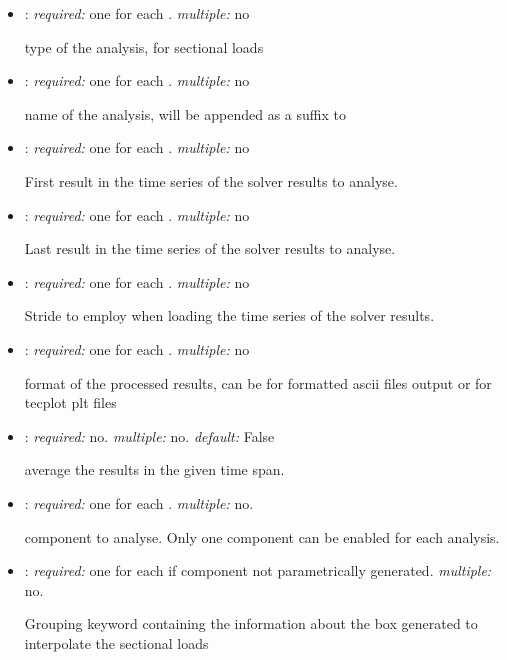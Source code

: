 \begin{itemize}
\item {}: \textit{required:} one for each . \textit{multiple:} no

type of the analysis,  for sectional loads

\item {}: \textit{required:} one for each . \textit{multiple:} no

name of the analysis, will be appended as a suffix to 

\item {}: \textit{required:} one for each . 
\textit{multiple:} no

First result in the time series of the solver results to analyse.

\item {}: \textit{required:} one for each . 
\textit{multiple:} no

Last result in the time series of the solver results to analyse.

\item {}: \textit{required:} one for each . 
\textit{multiple:} no

Stride to employ when loading the time series of the solver results. 

\item {}: \textit{required:} one for each . 
\textit{multiple:} no

format of the processed results, can be  for formatted ascii files 
output or  for tecplot plt files

\item {}: \textit{required:} no. \textit{multiple:} no. 
\textit{default:} False

average the results in the given time span.

\item {}: \textit{required:} one for each . 
\textit{multiple:} no.

component to analyse. Only one component can be enabled for each analysis. 

\item {}: \textit{required:} one for each  
if component not parametrically generated. \textit{multiple:} no.

Grouping keyword containing the information about the box generated to 
interpolate the sectional loads


\end{itemize}
